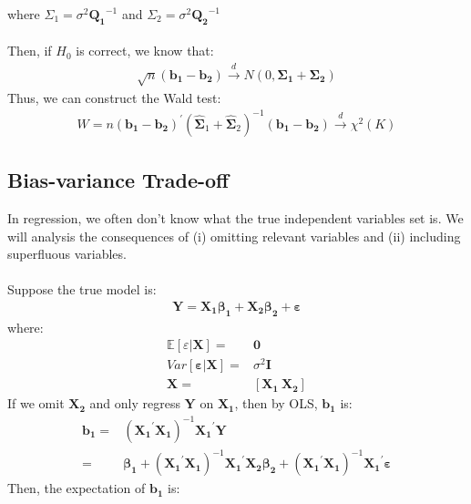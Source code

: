 \documentclass{article}
\begin{document}
where $\Sigma_1 = \sigma^2 \boldsymbol{Q_1}^{-1}$ and $\Sigma_2 = \sigma^2 \boldsymbol{Q_2}^{-1}$\\\\
Then, if $H_0$ is correct, we know that:
	\begin{align*}
		\sqrt{n}(\boldsymbol{b_1} - \boldsymbol{b_2}) \xrightarrow{d} N(0, \boldsymbol{\Sigma_1} + \boldsymbol{\Sigma_2})
	\end{align*}
Thus, we can construct the Wald test:
	\begin{align*}
		W = n (\boldsymbol{b_1} - \boldsymbol{b_2})^\prime (\hat{\boldsymbol{\Sigma}}_1 +  \hat{\boldsymbol{\Sigma}}_2)^{-1} (\boldsymbol{b_1} - \boldsymbol{b_2}) \xrightarrow{d} \chi^2(K)
	\end{align*}


\subsection{Bias-variance Trade-off}
In regression, we often don't know what the true independent variables set is. We will analysis the consequences of (i) omitting relevant variables and (ii) including superfluous variables.\\\\
Suppose the true model is:
	\begin{align*}
		\boldsymbol{Y} = \boldsymbol{X_1}\boldsymbol{\beta_1} + \boldsymbol{X_2}\boldsymbol{\beta_2} + \boldsymbol{\varepsilon}
	\end{align*}  
where:
	\begin{align*}
		\mathbb{E}[\varepsilon | \boldsymbol{X}] =& \boldsymbol{0}\\
		Var[\boldsymbol{\varepsilon} | \boldsymbol{X}] =& \sigma^2 \boldsymbol{I}\\
		\boldsymbol{X} =& [\boldsymbol{X_1}\ \boldsymbol{X_2}]
	\end{align*}
If we omit $\boldsymbol{X_2}$ and only regress $\boldsymbol{Y}$ on $\boldsymbol{X_1}$, then by OLS, $\boldsymbol{b_1}$ is:
	\begin{align*}
		\boldsymbol{b_1} = &(\boldsymbol{X_1}^\prime \boldsymbol{X_1})^{-1} \boldsymbol{X_1}^\prime \boldsymbol{Y}\\
		= &\boldsymbol{\beta_1} + (\boldsymbol{X_1}^\prime \boldsymbol{X_1})^{-1} \boldsymbol{X_1}^\prime \boldsymbol{X_2} \boldsymbol{\beta_2} + (\boldsymbol{X_1}^\prime \boldsymbol{X_1})^{-1} \boldsymbol{X_1}^\prime \boldsymbol{\varepsilon}
	\end{align*}
Then, the expectation of $\boldsymbol{b_1}$ is:
\end{document}
